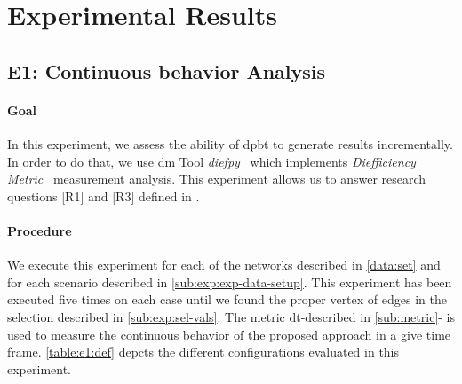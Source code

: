 \section{Experimental Results}\label{sec:exp:observed-results}
\subsection{E1: Continuous behavior Analysis}\label{sub:sec:exp-1} 
\paragraph{Goal} In this experiment, we assess the ability of \acrshort{dpbt} to generate results incrementally.
In order to do that, we use \acrfull{dm} Tool \emph{diefpy}~\cite{diefpy} which implements \emph{Diefficiency Metric}~\cite{diefpaper} measurement analysis.
This experiment allows us to answer research questions [R1] and [R3] defined in . 

\paragraph{Procedure} We execute this experiment for each of the networks described in \autoref{data:set} and for each scenario described in \autoref{sub:exp:exp-data-setup}.
This experiment has been executed five times on each case until we found the proper vertex of edges in the selection described in \autoref{sub:exp:sel-vals}.
The metric  \acrfull{dt}-described in \autoref{sub:metric}- is used to measure the continuous behavior of the proposed approach in a give time frame.
\autoref{table:e1:def} depcts the different configurations evaluated in this experiment.

